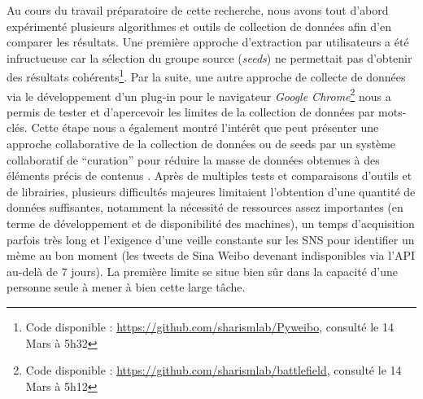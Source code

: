 Au cours du travail préparatoire de cette recherche, nous avons tout d{\textquoteright}abord expérimenté plusieurs algorithmes et outils de collection de données afin d{\textquoteright}en comparer les résultats. Une première approche d{\textquoteright}extraction par utilisateurs a été infructueuse car la sélection du groupe source (\textit{seeds}) ne permettait pas d{\textquoteright}obtenir des résultats cohérents\footnote{Code disponible : \url{https://github.com/sharismlab/Pyweibo}, consulté le 14 Mars à 5h32}. Par la suite, une autre approche de collecte de données via le développement d{\textquoteright}un plug-in pour le navigateur \textit{Google Chrome}\footnote{Code disponible : \url{https://github.com/sharismlab/battlefield}, consulté le 14 Mars à 5h12} nous a permis de tester et d{\textquoteright}apercevoir les limites de la collection de données par mots-clés. Cette étape nous a également montré l{\textquoteright}intér\^et que peut présenter une approche collaborative de la collection de données ou de seeds par un système collaboratif de ``curation'' pour réduire la masse de données obtenues à des éléments précis de contenus \citep{Ding2013}. Après de multiples tests et comparaisons d{\textquoteright}outils et de librairies, plusieurs difficultés majeures limitaient l{\textquoteright}obtention d{\textquoteright}une quantité de données suffisantes, notamment la nécessité de ressources assez importantes (en terme de développement et de disponibilité des machines), un temps d{\textquoteright}acquisition parfois très long et l{\textquoteright}exigence d{\textquoteright}une veille constante sur les SNS pour identifier un mème au bon moment (les tweets de Sina Weibo devenant indisponibles via l{\textquoteright}API au-delà de 7 jours). La première limite se situe bien s\^ur dans la capacité d{\textquoteright}une personne seule à mener à bien cette large t\^ache. 

